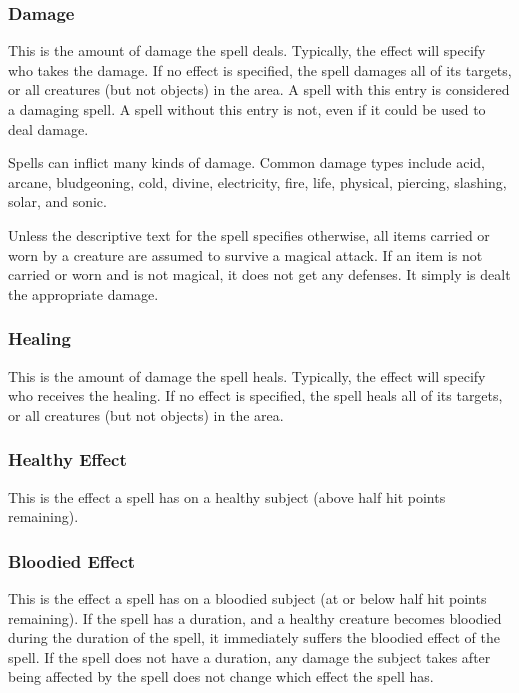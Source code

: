         \subsubsection{Damage}
            This is the amount of damage the spell deals. Typically, the effect will specify who takes the damage. If no effect is specified, the spell damages all of its targets, or all creatures (but not objects) in the area. A spell with this entry is considered a damaging spell. A spell without this entry is not, even if it could be used to deal damage.

            Spells can inflict many kinds of damage. Common damage types include acid, arcane, bludgeoning, cold, divine, electricity, fire, life, physical, piercing, slashing, solar, and sonic.

             Unless the descriptive text for the spell specifies otherwise, all items carried or worn by a creature are assumed to survive a magical attack. If an item is not carried or worn and is not magical, it does not get any defenses. It simply is dealt the appropriate damage.

        \subsubsection{Healing}
            This is the amount of damage the spell heals. Typically, the effect will specify who receives the healing. If no effect is specified, the spell heals all of its targets, or all creatures (but not objects) in the area.

        \subsubsection{Healthy Effect}
            This is the effect a spell has on a healthy subject (above half hit points remaining).

        \subsubsection{Bloodied Effect}
            This is the effect a spell has on a bloodied subject (at or below half hit points remaining). If the spell has a duration, and a healthy creature becomes bloodied during the duration of the spell, it immediately suffers the bloodied effect of the spell. If the spell does not have a duration, any damage the subject takes after being affected by the spell does not change which effect the spell has.

